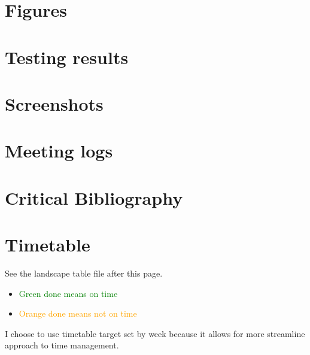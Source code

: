 \documentclass[]{report}
\begin{document}
\printbibliography[heading=bibintoc, title={Bibliography}]

\appendix
% 
\chapter{Figures}


\chapter{Testing results}


\chapter{Screenshots}

\chapter{Meeting logs}


\chapter{Critical Bibliography}

\chapter{Timetable}
See the landscape table file after this page.
\begin{itemize}
    \item \textcolor{Green}{Green done means on time}
    \item \textcolor{Orange}{Orange done means not on time}
\end{itemize}
I choose to use timetable target set by week because it allows for more streamline approach to time management.

\end{document}
